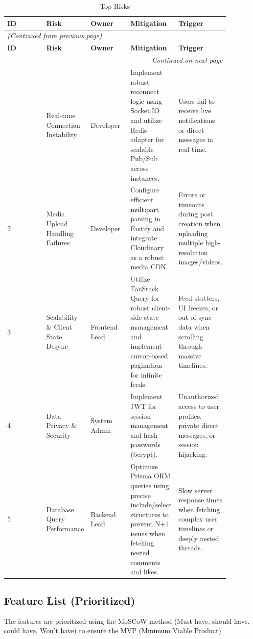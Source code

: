 \begin{longtable}{|p{0.18\linewidth}|p{0.18\linewidth}|p{0.18\linewidth}|p{0.18\linewidth}|p{0.18\linewidth}|}
\caption{Top Risks} \label{tab:3} \\
\hline
\textbf{ID} & \textbf{Risk} & \textbf{Owner} & \textbf{Mitigation} & \textbf{Trigger} \\
\hline
\endfirsthead
\multicolumn{5}{l}{\textit{(Continued from previous page)}} \\
\hline
\textbf{ID} & \textbf{Risk} & \textbf{Owner} & \textbf{Mitigation} & \textbf{Trigger} \\
\hline
\endhead
\hline \multicolumn{5}{r}{\textit{Continued on next page}} \\
\endfoot
\hline
\endlastfoot
1 & Real-time Connection Instability & Developer & Implement robust reconnect logic using Socket.IO and utilize Redis adapter for scalable Pub/Sub across instances. & Users fail to receive live notifications or direct messages in real-time. \\
\hline
2 & Media Upload Handling Failures & Developer & Configure efficient multipart parsing in Fastify and integrate Cloudinary as a robust media CDN. & Errors or timeouts during post creation when uploading multiple high-resolution images/videos. \\
\hline
3 & Scalability \& Client State Desync & Frontend Lead & Utilize TanStack Query for robust client-side state management and implement cursor-based pagination for infinite feeds. & Feed stutters, UI freezes, or out-of-sync data when scrolling through massive timelines. \\
\hline
4 & Data Privacy \& Security & System Admin & Implement JWT for session management and hash passwords (bcrypt). & Unauthorized access to user profiles, private direct messages, or session hijacking. \\
\hline
5 & Database Query Performance & Backend Lead & Optimize Prisma ORM queries using precise include/select structures to prevent N+1 issues when fetching nested comments and likes. & Slow server response times when fetching complex user timelines or deeply nested threads. \\
\hline
\end{longtable}


\subsection{Feature List (Prioritized)}

The features are prioritized using the MoSCoW method (Must have, should have, could have, Won't have) to ensure the MVP (Minimum Viable Product)

